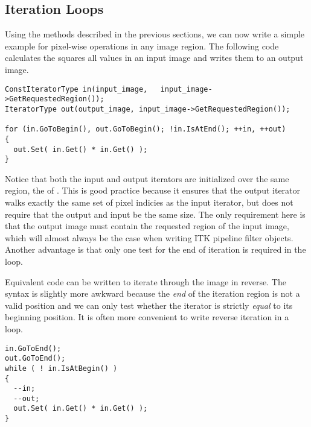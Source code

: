 \subsection{Iteration Loops}
\label{sec:IterationExample}
Using the methods described in the previous sections, we can now write a simple
example for pixel-wise operations in any image region.  The following code
calculates the squares all values in an input image and writes them to an
output image.

\begin{verbatim}
ConstIteratorType in(input_image,   input_image->GetRequestedRegion());
IteratorType out(output_image, input_image->GetRequestedRegion());

for (in.GoToBegin(), out.GoToBegin(); !in.IsAtEnd(); ++in, ++out)
{
  out.Set( in.Get() * in.Get() );
}
\end{verbatim}

Notice that both the input and output iterators are initialized over the same
region, the  of .  This is good
practice because it ensures that the output iterator walks exactly the same set
of pixel indicies as the input iterator, but does not require that the output
and input be the same size.  The only requirement here is that the output image must
contain the requested region of the input image, which will almost always be
the case when writing ITK pipeline filter objects.  Another advantage is that
only one test for the end of iteration is required in the  loop.

Equivalent code can be written to iterate through the image in reverse.
The syntax is slightly more awkward because the \emph{end} of the
iteration region is not a valid position and we can only test whether the
iterator is strictly \emph{equal} to its beginning position.  It is often more
convenient to write reverse iteration in a
 loop.

\begin{verbatim}
in.GoToEnd();
out.GoToEnd();
while ( ! in.IsAtBegin() )
{
  --in;
  --out;
  out.Set( in.Get() * in.Get() );
}

\end{verbatim}


